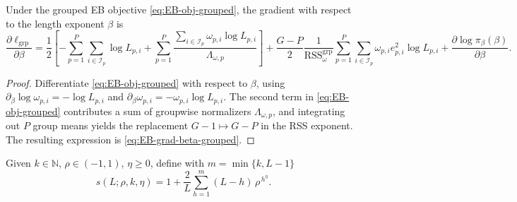 \begin{corollary}
\label{cor:grad-beta-grouped}
Under the grouped EB objective \eqref{eq:EB-obj-grouped}, the gradient with respect to the length exponent $\beta$ is
\begin{equation}
\label{eq:EB-grad-beta-grouped}
\frac{\partial \ell_{\mathrm{grp}}}{\partial \beta}
=\frac{1}{2}\!\left[-\sum_{p=1}^P\sum_{i\in\mathcal I_p} \log L_{p,i}
+\sum_{p=1}^P\frac{\sum_{i\in\mathcal I_p} \omega_{p,i} \log L_{p,i}}{\Lambda_{\omega,p}}\right]
+\frac{G-P}{2}\frac{1}{\mathrm{RSS}_{\omega}^{\mathrm{grp}}}\sum_{p=1}^P\sum_{i\in\mathcal I_p} \omega_{p,i} e_{p,i}^2 \log L_{p,i}
+\frac{\partial \log \pi_\beta(\beta)}{\partial \beta}.
\end{equation}
\end{corollary}
\begin{proof}
Differentiate \eqref{eq:EB-obj-grouped} with respect to $\beta$, using $\partial_\beta\log \omega_{p,i}=-\log L_{p,i}$ and $\partial_\beta \omega_{p,i}=-\omega_{p,i}\log L_{p,i}$. The second term in \eqref{eq:EB-obj-grouped} contributes a sum of groupwise normalizers $\Lambda_{\omega,p}$, and integrating out $P$ group means yields the replacement $G-1\mapsto G-P$ in the RSS exponent. The resulting expression is \eqref{eq:EB-grad-beta-grouped}.
\end{proof}

\begin{definition}
\label{def:kband}
Given \(k\in\mathbb N\), \(\rho\in(-1,1)\), \(\eta\ge 0\), define with \(m=\min\{k,L-1\}\)
\begin{equation}
\label{eq:s-family}
s(L;\rho,k,\eta)=1+\frac{2}{L}\sum_{h=1}^m (L-h)\,\rho^{\,h^{\eta}}.
\end{equation}
\end{definition}

